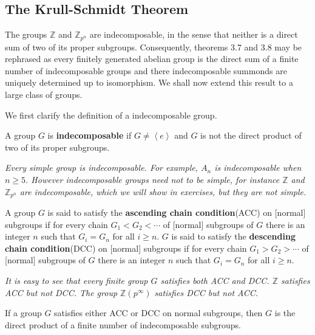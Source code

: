 \subsection{The Krull-Schmidt Theorem}
The groups $\mathbb{Z}$ and $\mathbb{Z}_{p^n}$ are indecomposable, in the sense that neither is a direct sum of two of its proper subgroups. Consequently, theorems 3.7 and 3.8 may be rephrased as every finitely generated abelian group is the direct sum of a finite number of indecomposable groups and there indecomposable summonds are uniquely determined up to isomorphism. We shall now extend this result to a large class of groups.\par
We first clarify the definition of a indecomposable group.
\begin{definition}
A group $G$ is \textbf{indecomposable} if $G\ne\left<e\right>$ and $G$ is not the direct product of two of its proper subgroups.
\end{definition}
\begin{example}\em
Every simple group is indecomposable. For example, $A_n$ is indecomposable when $n\ge 5$. However indecomposable groups need not to be simple, for instance $\mathbb{Z}$ and $\mathbb{Z}_{p^n}$ are indecomposable, which we will show in exercises, but they are not simple.
\end{example}
\begin{definition}
A group $G$ is said to satisfy the \textbf{ascending chain condition}(ACC) on [normal] subgroups if for every chain $G_1<G_2<\cdots$ of [normal] subgroups of $G$ there is an integer $n$ such that $G_i=G_n$ for all $i\ge n$. $G$ is said to satisfy the \textbf{descending chain condition}(DCC) on [normal] subgroups if for every chain $G_1>G_2>\cdots$ of [normal] subgroups of $G$ there is an integer $n$ such that $G_i=G_n$ for all $i\ge n$.
\end{definition}
\begin{example}\em
It is easy to see that every finite group $G$ satisfies both ACC and DCC. $\mathbb{Z}$ satisfies ACC but not DCC. The group $\mathbb{Z}(p^\infty)$ satisfies DCC but not ACC.
\end{example}
\begin{theorem}
If a group $G$ satisfies either ACC or DCC on normal subgroups, then $G$ is the direct product of a finite number of indecomposable subgroups.
\end{theorem}
